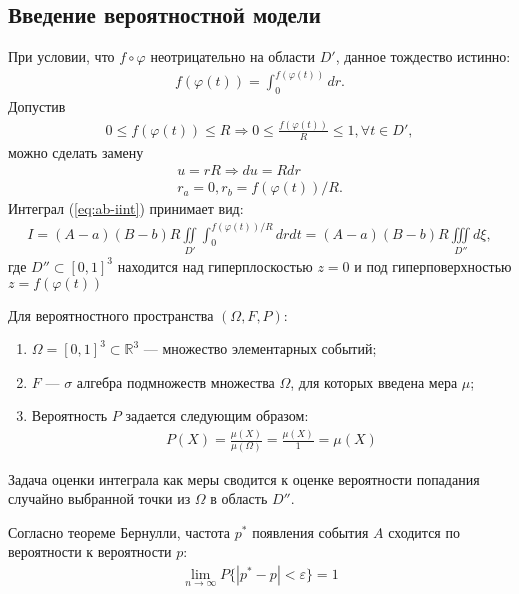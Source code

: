 \subsection{Введение вероятностной модели}\label{method-1}
При условии, что \(f\circ\varphi\) неотрицательно на области \(D'\), данное тождество истинно:
\begin{align}
	f(\varphi(t)) = \int_0^{f(\varphi(t))}dr.
\end{align}
Допустив
\begin{align}
	0 \leq f(\varphi(t)) \leq R \Longrightarrow 0 \leq \frac{f(\varphi(t))}{R} \leq 1, \forall t \in D',
\end{align}
можно сделать замену
\begin{align}
	u = r R \Longrightarrow du = R dr \\
	r_a = 0, r_b = f(\varphi(t))/R.
\end{align}
Интеграл (\ref{eq:ab-iint}) принимает вид:
\begin{align}
	I = (A - a)(B - b)R\iint\limits_{D'}\int_0^{f(\varphi(t))/R}drdt = (A - a)(B - b)R \iiint\limits_{D''}d\xi,
\end{align}
где \(D'' \subset [0,1]^3\) находится над гиперплоскостью \(z = 0\) и под гиперповерхностью \(z =f(\varphi(t))\)

Для вероятностного пространства \((\Omega, F, P)\):
\begin{enumerate}
	\item \(\Omega = [0,1]^3 \subset \mathbb{R}^3\) --- множество элементарных событий;
	\item \(F\) --- \(\sigma\) алгебра подмножеств множества \(\Omega\), для которых введена мера \(\mu\);
	\item Вероятность \(P\) задается следующим образом:
	      \begin{align*}
		      P(X) = \frac{\mu(X)}{\mu(\Omega)} = \frac{\mu(X)}{1} = \mu(X)
	      \end{align*}
\end{enumerate}
Задача оценки интеграла как меры сводится к оценке вероятности попадания случайно выбранной точки из \(\Omega\) в область \(D''\).

Согласно теореме Бернулли, частота \(p^*\) появления события \(A\) сходится по вероятности к вероятности \(p\):
\begin{align}
	\lim_{n\to\infty}P\{|p^* - p| < \varepsilon \} = 1
\end{align}

